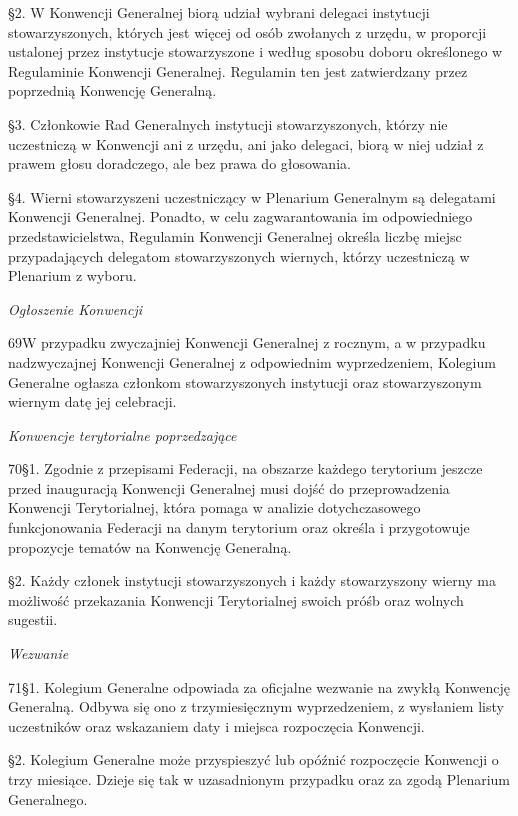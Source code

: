 ﻿\documentclass{book}
\newcommand{\lett}[1]{\lettrine[findent=6pt]{#1}}
\newcommand{\ssec}[1]{\vspace{1em}\textit{#1}\vspace{.5em}\nopagebreak}
\begin{document}
\S{}2. W Konwencji Generalnej biorą udział wybrani delegaci instytucji stowarzyszonych, których jest więcej od osób zwołanych z urzędu, w proporcji ustalonej przez instytucje stowarzyszone i według sposobu doboru określonego w Regulaminie Konwencji Generalnej. Regulamin ten jest zatwierdzany przez poprzednią Konwencję Generalną.


\S{}3. Członkowie Rad Generalnych instytucji stowarzyszonych, którzy nie uczestniczą w Konwencji ani z urzędu, ani jako delegaci, biorą w niej udział z prawem głosu doradczego, ale bez prawa do głosowania.


\S{}4. Wierni stowarzyszeni uczestniczący w Plenarium Generalnym są delegatami Konwencji Generalnej. Ponadto, w celu zagwarantowania im odpowiedniego  przedstawicielstwa, Regulamin Konwencji Generalnej określa liczbę miejsc przypadających delegatom stowarzyszonych wiernych, którzy uczestniczą w Plenarium z wyboru.
 
\ssec{Ogłoszenie Konwencji}


\lett{69} W przypadku zwyczajniej Konwencji Generalnej z rocznym, a w przypadku nadzwyczajnej Konwencji Generalnej z odpowiednim wyprzedzeniem, Kolegium Generalne ogłasza członkom stowarzyszonych instytucji oraz stowarzyszonym wiernym datę jej celebracji.








\ssec{Konwencje terytorialne poprzedzające}


\lett{70} \S{}1. Zgodnie z przepisami Federacji, na obszarze każdego terytorium jeszcze przed inauguracją Konwencji Generalnej musi dojść do przeprowadzenia Konwencji Terytorialnej, która pomaga w analizie dotychczasowego funkcjonowania Federacji na danym terytorium oraz określa i przygotowuje propozycje tematów na Konwencję Generalną.


\S{}2. Każdy członek instytucji stowarzyszonych i każdy stowarzyszony wierny ma możliwość przekazania Konwencji Terytorialnej swoich próśb oraz wolnych sugestii.
 
\ssec{Wezwanie}


\lett{71} \S{}1.  Kolegium Generalne odpowiada za oficjalne wezwanie na zwykłą Konwencję Generalną. Odbywa się ono z trzymiesięcznym wyprzedzeniem, z wysłaniem listy uczestników oraz wskazaniem daty i miejsca rozpoczęcia Konwencji.


\S{}2. Kolegium Generalne może przyspieszyć lub opóźnić rozpoczęcie Konwencji o trzy miesiące. Dzieje się tak w uzasadnionym przypadku oraz za zgodą Plenarium Generalnego.
 
\end{document}
